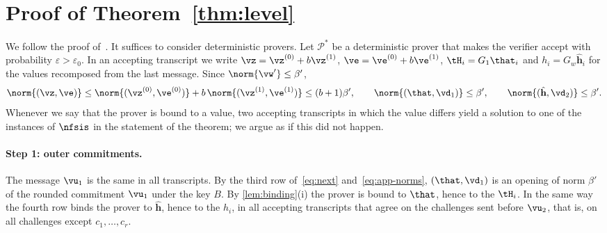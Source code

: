 \appendix

\section{Proof of Theorem~\ref{thm:level}}\label{app:proof}

We follow the proof of~\cite[Theorem~5.1]{BS23}. It suffices to consider deterministic provers. Let $\mathcal P^*$ be a deterministic prover that makes the verifier accept with probability $\varepsilon>\varepsilon_0$. In an accepting transcript we write $\vz=\vz^{(0)}+b\vz^{(1)}$, $\ve=\ve^{(0)}+b\ve^{(1)}$, $\tH_i=G_1\that_i$ and $h_i=G_w\hat{\mathbf h}_i$ for the values recomposed from the last message. Since $\norm{\vw'}\le\beta'$,
\begin{equation}\label{eq:app-norms}
\norm{(\vz,\ve)}\le\norm{(\vz^{(0)},\ve^{(0)})}+b\,\norm{(\vz^{(1)},\ve^{(1)})}\le(b+1)\beta',\qquad\norm{(\that,\vd_1)}\le\beta',\qquad\norm{(\hat{\mathbf h},\vd_2)}\le\beta' .
\end{equation}
Whenever we say that the prover is bound to a value, two accepting transcripts in which the value differs yield a solution to one of the instances of $\nfsis$ in the statement of the theorem; we argue as if this did not happen.

\paragraph{Step 1: outer commitments.}
The message $\vu_1$ is the same in all transcripts. By the third row of~\eqref{eq:next} and~\eqref{eq:app-norms}, $(\that,\vd_1)$ is an opening of norm $\beta'$ of the rounded commitment $\vu_1$ under the key $B$. By \cref{lem:binding}(i) the prover is bound to $\that$, hence to the $\tH_i$. In the same way the fourth row binds the prover to $\hat{\mathbf h}$, hence to the $h_i$, in all accepting transcripts that agree on the challenges sent before $\vu_2$, that is, on all challenges except $c_1,\dots,c_r$.

